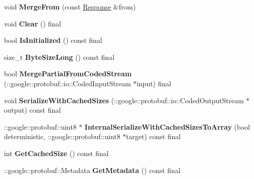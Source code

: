 \begin{DoxyCompactItemize}
\item 
\mbox{\label{classcoappbrpc_1_1Response_a9e65ff105d739a4f0fda6cf8ea0dd91f}} 
void {\bfseries Merge\+From} (const \hyperlink{classcoappbrpc_1_1Response}{Response} \&from)
\item 
\mbox{\label{classcoappbrpc_1_1Response_aa9b68b199f18a06cf3036430e6469ec2}} 
void {\bfseries Clear} () final
\item 
\mbox{\label{classcoappbrpc_1_1Response_a687c386d4428e724be5226c2c2c14479}} 
bool {\bfseries Is\+Initialized} () const final
\item 
\mbox{\label{classcoappbrpc_1_1Response_a85bd1f7ae73c9dc3d370547a2794d56d}} 
size\+\_\+t {\bfseries Byte\+Size\+Long} () const final
\item 
\mbox{\label{classcoappbrpc_1_1Response_a338f6e91d6b68734fab073e37e842104}} 
bool {\bfseries Merge\+Partial\+From\+Coded\+Stream} (\+::google\+::protobuf\+::io\+::\+Coded\+Input\+Stream $\ast$input) final
\item 
\mbox{\label{classcoappbrpc_1_1Response_a9245b3575fed37198c288936a47ba31c}} 
void {\bfseries Serialize\+With\+Cached\+Sizes} (\+::google\+::protobuf\+::io\+::\+Coded\+Output\+Stream $\ast$output) const final
\item 
\mbox{\label{classcoappbrpc_1_1Response_a54352ac27422f88aec17253468593172}} 
\+::google\+::protobuf\+::uint8 $\ast$ {\bfseries Internal\+Serialize\+With\+Cached\+Sizes\+To\+Array} (bool deterministic, \+::google\+::protobuf\+::uint8 $\ast$target) const final
\item 
\mbox{\label{classcoappbrpc_1_1Response_a4eeebf1befe309f178185e3f8b4da3d1}} 
int {\bfseries Get\+Cached\+Size} () const final
\item 
\mbox{\label{classcoappbrpc_1_1Response_a6724cea13f3ebabd4db02fead5bf0b12}} 
\+::google\+::protobuf\+::\+Metadata {\bfseries Get\+Metadata} () const final
\item 

\end{DoxyCompactItemize}
